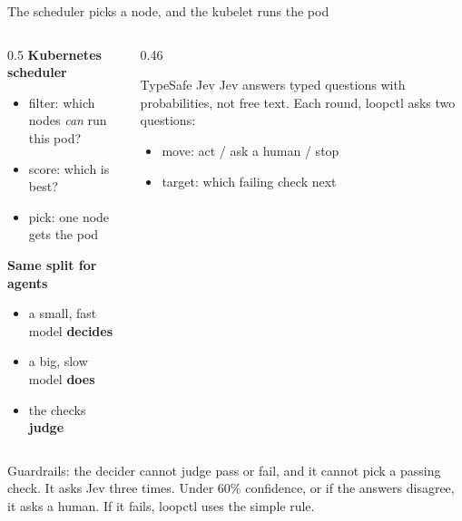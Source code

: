 \documentclass[aspectratio=169]{beamer}
\begin{document}
\begin{frame}{The scheduler picks a node, and the kubelet runs the pod}
  \begin{columns}[T]
    \begin{column}{0.5\textwidth}
      \textbf{Kubernetes scheduler}
      \begin{itemize}
        \item filter: which nodes \emph{can} run this pod?
        \item score: which is best?
        \item pick: one node gets the pod
      \end{itemize}
      \vspace{0.2cm}
      \textbf{Same split for agents}
      \begin{itemize}
        \item a small, fast model \textbf{decides}
        \item a big, slow model \textbf{does}
        \item the checks \textbf{judge}
      \end{itemize}
    \end{column}
    \begin{column}{0.46\textwidth}
      \begin{block}{TypeSafe Jev}
        Jev answers typed questions with probabilities, not free text. Each round, loopctl asks two questions:
        \begin{itemize}
          \item move: act / ask a human / stop
          \item target: which failing check next
        \end{itemize}
      \end{block}
    \end{column}
  \end{columns}
  \vspace{0.2cm}
  \small Guardrails: the decider cannot judge pass or fail, and it cannot pick a passing check. It asks Jev three times. Under 60\% confidence, or if the answers disagree, it asks a human. If it fails, loopctl uses the simple rule.
\end{frame}
\end{document}
